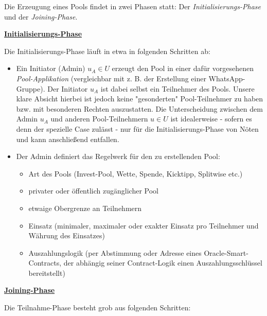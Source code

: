 
Die Erzeugung eines Pools findet in zwei Phasen statt: Der \textit{Initialisierungs-Phase} und der \textit{Joining-Phase}.

\vspace{0.5cm}

\underline{\textbf{Initialisierungs-Phase}}

\vspace{0.2cm}

Die Initialisierungs-Phase läuft in etwa in folgenden Schritten ab:

\begin{itemize}
	\item Ein Initiator (Admin) $u_A \in U$ erzeugt den Pool in einer dafür vorgesehenen \textit{Pool-Applikation} (vergleichbar mit z. B. der Erstellung einer WhatsApp-Gruppe). Der Initiator $u_A$ ist dabei selbst ein Teilnehmer des Pools. Unsere klare Absicht hierbei ist jedoch keine "gesonderten" Pool-Teilnehmer zu haben bzw. mit besonderen Rechten auszustatten. Die Unterscheidung zwischen dem Admin $u_A$ und anderen Pool-Teilnehmern $u \in U$ ist idealerweise - sofern es denn der spezielle Case zulässt - nur für die Initialisierungs-Phase von Nöten und kann anschließend entfallen.
	\item Der Admin definiert das Regelwerk für den zu erstellenden Pool:
	\begin{itemize}
		\item Art des Pools (Invest-Pool, Wette, Spende, Kicktipp, Splitwise etc.)
		\item privater oder öffentlich zugänglicher Pool
		\item etwaige Obergrenze an Teilnehmern
		\item Einsatz (minimaler, maximaler oder exakter Einsatz pro Teilnehmer und Währung des Einsatzes)
		\item Auszahlungslogik (per Abstimmung oder Adresse eines Oracle-Smart-Con\-tracts, der abhängig seiner Contract-Logik einen Auszahlungsschlüssel bereit\-stellt)
	\end{itemize}
\end{itemize}

\vspace{0.3cm}

\underline{\textbf{Joining-Phase}}

\vspace{0.2cm}

Die Teilnahme-Phase besteht grob aus folgenden Schritten:

